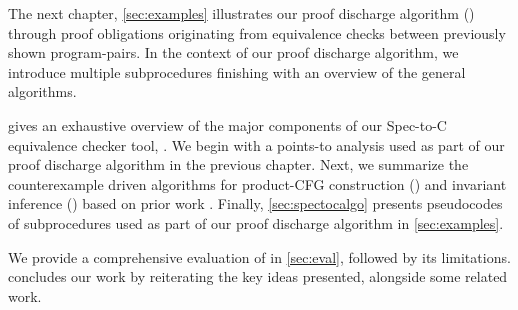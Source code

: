 The next chapter, \cref{sec:examples} illustrates our proof discharge algorithm () through
proof obligations originating from equivalence checks between previously shown program-pairs.
In the context of our proof discharge algorithm, we introduce multiple subprocedures finishing with
an overview of the general algorithms.

 gives an exhaustive overview of the major components of our Spec-to-C equivalence checker tool, \toolName{}.
We begin with a points-to analysis used as part of our proof discharge algorithm in the previous chapter.
Next, we summarize the counterexample driven algorithms for product-CFG construction ()
and invariant inference () based on prior work \cite{oopsla20}.
Finally, \cref{sec:spectocalgo} presents pseudocodes of subprocedures used as part of our
proof discharge algorithm in \cref{sec:examples}.

We provide a comprehensive evaluation of \toolName{} in \cref{sec:eval}, followed by its limitations.
 concludes our work by reiterating the key ideas presented, alongside some related work.
